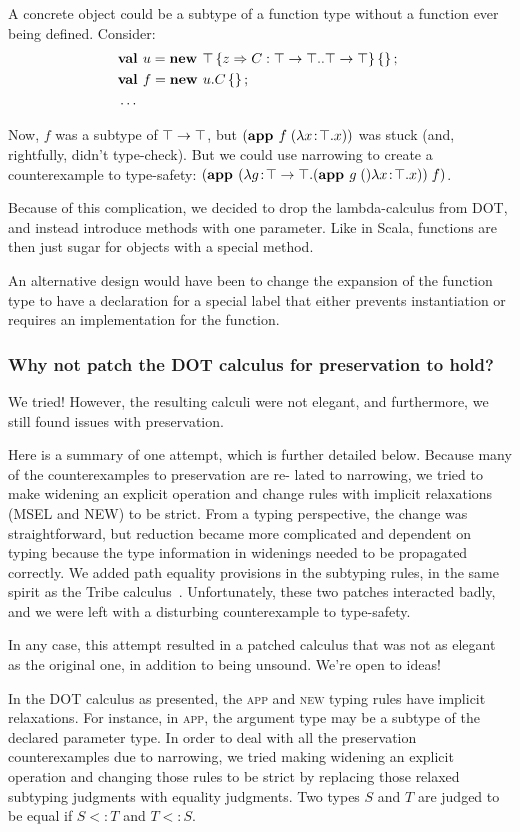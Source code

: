 \documentclass[9pt]{sigplanconf}
\begin{document}
A concrete object could be a subtype of a function type without a
function ever being defined. Consider:
\begin{align*}
&\mlnew u {\Top \refine z {\Ldecl C {\Top \tfun \Top} {\Top \tfun \Top}} \ldefs{}} {
\mlnew f {u.C \ldefs{}} {
\ldots
}}
\end{align*}

Now, $f$ was a subtype of $\top \rightarrow \top$, but $(\textbf{app }f\;(\lambda x\!:\!\top.x))$ was stuck (and, rightfully, didn't type-check). But we could use
narrowing to create a counterexample to type-safety: $(\textbf{app }(\lambda g\!:\!\top \rightarrow \top.(\textbf{app }g\;()\lambda x\!:\!\top.x))\;f)$.

Because of this complication, we decided to drop the lambda-calculus
from DOT, and instead introduce methods with one parameter. Like in
Scala, functions are then just sugar for objects with a special
method.

An alternative design would have been to change the expansion of the
function type to have a declaration for a special label that either
prevents instantiation or requires an implementation for the
function.

\subsubsection{Why not patch the DOT calculus for preservation to hold?}\label{pres-patch}

We tried! However, the resulting calculi were not elegant, and
furthermore, we still found issues with preservation.

Here is a summary of one attempt, which is further detailed
below. Because many of the counterexamples to preservation are re-
lated to narrowing, we tried to make widening an explicit operation
and change rules with implicit relaxations (MSEL and NEW) to be
strict. From a typing perspective, the change was straightforward, but
reduction became more complicated and dependent on typing because the
type information in widenings needed to be propagated correctly.  We
added path equality provisions in the subtyping rules, in the same
spirit as the Tribe calculus~\cite{tribe}.  Unfortunately, these two
patches interacted badly, and we were left with a disturbing
counterexample to type-safety.

In any case, this attempt resulted in a patched calculus that was not
as elegant as the original one, in addition to being unsound. We're
open to ideas!

In the DOT calculus as presented, the \textsc{app} and \textsc{new} typing
rules have implicit relaxations. For instance, in \textsc{app}, the
argument type may be a subtype of the declared parameter type. In
order to deal with all the preservation counterexamples due to narrowing, we
tried making widening an explicit operation and changing those rules to be
strict by replacing those relaxed subtyping judgments with equality
judgments. Two types $S$ and $T$ are judged to be equal if $S <: T$
and $T <: S$.
\end{document}
